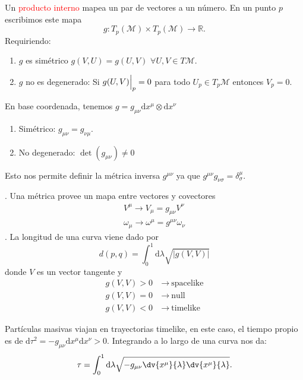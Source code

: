 \documentclass[../main]{subfiles}
\begin{document}
 Un \textcolor{red}{producto interno} mapea un par de vectores a un número. En un punto $p$ escribimos este mapa 
\begin{equation}
    g: T_p(\mathcal{M}) \times T_p(\mathcal{M})\rightarrow \mathbb{R}.
\end{equation}
Requiriendo:
\begin{enumerate}
    \item $g$ es simétrico $g(V, U)=g(U, V)$ $\forall U, V \in T\mathcal{M}$.
    \item $g$ no es degenerado: Si $g(U, V)\Big{|}_p=0$ para todo $U_p \in T_p \mathcal{M}$ entonces $V_p=0$.
\end{enumerate}
En base coordenada, tenemos $g=g_{\mu\nu} \mathrm{d}x^{\mu}\otimes \mathrm{d}x^{\nu}$
\begin{enumerate}
    \item Simétrico: $g_{\mu\nu}=g_{\nu\mu}$.
    \item No degenerado: $\det (g_{\mu\nu})\neq 0$
\end{enumerate}
Esto nos permite definir la métrica inversa $g^{\mu\nu}$ ya que $g^{\mu\nu}g_{\nu\sigma}=\delta^{\mu}_{\sigma}$.

\proposicion{\textcolor{red}{(La métrica como una mapa dual)}}. Una métrica provee un mapa entre vectores y covectores 
\begin{equation}
    \begin{split}
        V^{\mu} \rightarrow V_{\mu}=g_{\mu\nu} V^{\nu}\\
        \omega_{\mu} \rightarrow \omega^{\mu}=g^{\mu\nu} \omega_{\nu}
    \end{split}
\end{equation}
. La longitud de una curva viene dado por 
\begin{equation}
    d(p, q)=\int_0^1 \mathrm{d}\lambda \sqrt{|g(V, V)|}
\end{equation}
donde $V$ es un vector tangente y 
\begin{equation}
    \begin{split}
        g(V, V)>0 &\ \rightarrow \ \text{spacelike}\\
        g(V, V)=0 &\ \rightarrow \ \text{null}\\
        g(V, V)<0 &\ \rightarrow \ \text{timelike}
    \end{split}
\end{equation}

Partículas masivas viajan en trayectorias timelike, en este caso, el tiempo propio es de $\mathrm{d}\tau^2=-g_{\mu\nu} \mathrm{d}x^{\mu}\mathrm{d}x^{\nu}>0$. Integrando a lo largo de una curva nos da:
\begin{equation}
    \tau=\int_0^1 \mathrm{d}\lambda \sqrt{-g_{\mu\nu} \dv{x^{\mu}}{\lambda}\dv{x^{\mu}}{\lambda}}.
\end{equation}
\end{document}
